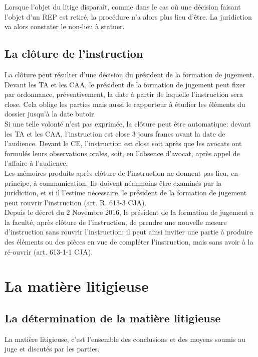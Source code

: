 \documentclass[10pt, a4paper, openany]{book}
\begin{document}
Lorsque l'objet du litige disparaît, comme dans le cas où une décision faisant l'objet d'un REP est retiré, la procédure n'a alors plus lieu d'être. La juridiction va alors constater le non-lieu à statuer. 

\subsection{La clôture de l'instruction}

La clôture peut résulter d'une décision du président de la formation de jugement. \\
Devant les TA et les CAA, le président de la formation de jugement peut fixer par ordonnance, préventivement, la date à partir de laquelle l'instruction sera close. Cela oblige les parties mais aussi le rapporteur à étudier les éléments du dossier jusqu'à la date butoir. \\
Si une telle volonté n'est pas exprimée, la clôture peut être automatique: devant les TA et les CAA, l'instruction est close 3 jours francs avant la date de l'audience. Devant le CE, l'instruction est close soit après que les avocats ont formulés leurs observations orales, soit, en l'absence d'avocat, après appel de l'affaire à l'audience. \\
Les mémoires produits après clôture de l'instruction ne donnent pas lieu, en principe, à communication. Ils doivent néanmoins être examinés par la juridiction, et si il l'estime nécessaire, le président de la formation de jugement peut rouvrir l'instruction (art. R. 613-3 CJA). \\
Depuis le décret du 2 Novembre 2016, le président de la formation de jugement a la faculté, après clôture de l'instruction, de prendre une nouvelle mesure d'instruction sans rouvrir l'instruction: il peut ainsi inviter une partie à produire des éléments ou des pièces en vue de compléter l'instruction, mais sans avoir à la ré-ouvrir (art. 613-1-1 CJA). 

\section{La matière litigieuse}

\subsection{La détermination de la matière litigieuse}

La matière litigieuse, c'est l'ensemble des conclusions et des moyens soumis au juge et discutés par les parties. 
\end{document}
